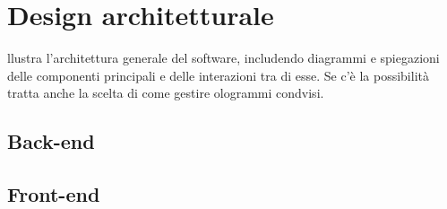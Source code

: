 \section{Design architetturale}\label{sec:design}
llustra l'architettura generale del software, includendo diagrammi e spiegazioni delle componenti principali e delle interazioni tra di esse. Se c'è la possibilità tratta anche la 
scelta di come gestire ologrammi condvisi.

\subsection{Back-end}\label{subsec:be}
\subsection{Front-end}\label{subsec:fe}